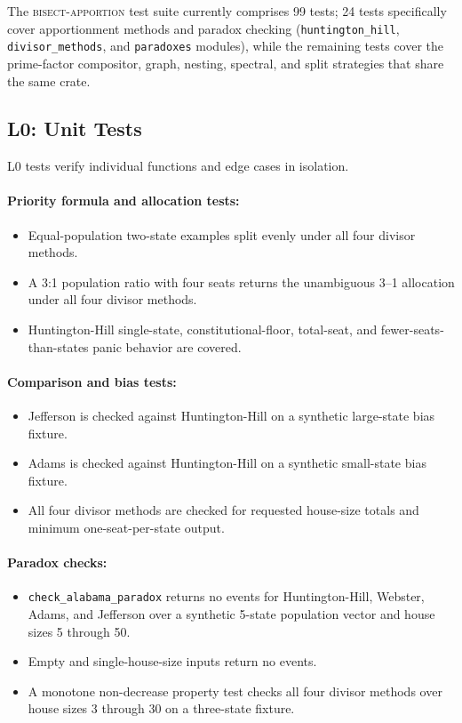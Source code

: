 \label{sec:tests}

The \textsc{bisect-apportion} test suite currently comprises 99 tests;
24 tests specifically cover apportionment methods and paradox checking
(\texttt{huntington\_hill}, \texttt{divisor\_methods}, and
\texttt{paradoxes} modules), while the remaining tests cover the
prime-factor compositor, graph, nesting, spectral, and split strategies
that share the same crate.

\subsection{L0: Unit Tests}

L0 tests verify individual functions and edge cases in isolation.

\paragraph{Priority formula and allocation tests:}
\begin{itemize}
  \item Equal-population two-state examples split evenly under all four divisor
    methods.
  \item A 3:1 population ratio with four seats returns the unambiguous 3--1
    allocation under all four divisor methods.
  \item Huntington-Hill single-state, constitutional-floor, total-seat, and
    fewer-seats-than-states panic behavior are covered.
\end{itemize}

\paragraph{Comparison and bias tests:}
\begin{itemize}
  \item Jefferson is checked against Huntington-Hill on a synthetic large-state
    bias fixture.
  \item Adams is checked against Huntington-Hill on a synthetic small-state bias
    fixture.
  \item All four divisor methods are checked for requested house-size totals and
    minimum one-seat-per-state output.
\end{itemize}

\paragraph{Paradox checks:}
\begin{itemize}
  \item \texttt{check\_alabama\_paradox} returns no events for Huntington-Hill,
    Webster, Adams, and Jefferson over a synthetic 5-state population vector and
    house sizes 5 through 50.
  \item Empty and single-house-size inputs return no events.
  \item A monotone non-decrease property test checks all four divisor methods
    over house sizes 3 through 30 on a three-state fixture.
\end{itemize}

